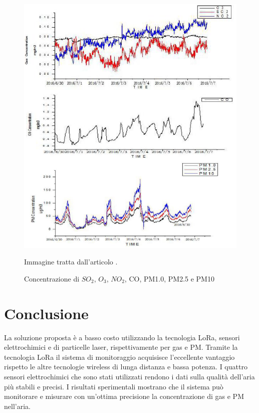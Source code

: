 \documentclass[a4paper]{report} %
\begin{document}
\begin{figure}
	\centering
	\includegraphics[scale=.5]{Immagini/risAria.png}	
	\caption{Concentrazione di $SO_{2}$, $O_{3}$, $NO_{2}$, CO, PM1.0, PM2.5 e PM10}
	\label{fig:concentrazioni}
	Immagine tratta dall'articolo \cite{art:rif.40}.\\
\end{figure}

\section{Conclusione}
La soluzione proposta è a basso costo utilizzando la tecnologia LoRa, sensori elettrochimici e di particelle laser, rispettivamente per gas e PM. Tramite la tecnologia LoRa il sistema di monitoraggio acquisisce l'eccellente vantaggio rispetto le altre tecnologie wireless di lunga distanza e bassa potenza. I quattro sensori elettrochimici che sono stati utilizzati rendono i dati sulla qualità dell'aria più stabili e precisi. I risultati sperimentali mostrano che il sistema può monitorare e misurare con un'ottima precisione la concentrazione di gas e PM nell'aria.



\end{document}
